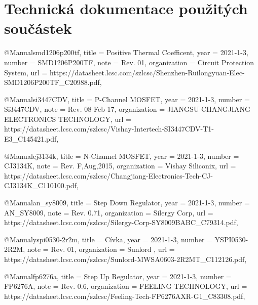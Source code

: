 \section{Technická dokumentace použitých součástek}

@Manual{smd1206p200tf,
    title        = {Positive Thermal Coefficent},
    year         = {2021-1-3},
    number       = {SMD1206P200TF},
    note         = {Rev. 01},
    organization = {Circuit Protection System},
    url          = {https://datasheet.lcsc.com/szlcsc/Shenzhen-Ruilongyuan-Elec-SMD1206P200TF_C20988.pdf},
}

@Manual{si3447CDV,
    title        = {P-Channel MOSFET},
    year         = {2021-1-3},
    number       = {Si3447CDV},
    note         = {Rev. 08-Feb-17},
    organization = {JIANGSU CHANGJIANG ELECTRONICS TECHNOLOGY},
    url          = {https://datasheet.lcsc.com/szlcsc/Vishay-Intertech-SI3447CDV-T1-E3_C145421.pdf},
}

@Manual{cj3134k,
    title        = {N-Channel MOSFET},
    year         = {2021-1-3},
    number       = {CJ3134K},
    note         = {Rev. F,Aug,2015},
    organization = {Vishay Siliconix},
    url          = {https://datasheet.lcsc.com/szlcsc/Changjiang-Electronics-Tech-CJ-CJ3134K_C110100.pdf},
}

@Manual{an_sy8009,
    title        = {Step Down Regulator},
    year         = {2021-1-3},
    number       = {AN_SY8009},
    note         = {Rev. 0.71},
    organization = {Silergy Corp},
    url          = {https://datasheet.lcsc.com/szlcsc/Silergy-Corp-SY8009BABC_C79314.pdf},
}

@Manual{yspi0530-2r2m,
    title        = {Cívka},
    year         = {2021-1-3},
    number       = {YSPI0530-2R2M},
    note         = {Rev. 01},
    organization = {Sunlord },
    url          = {https://datasheet.lcsc.com/szlcsc/Sunlord-MWSA0603-2R2MT_C112126.pdf},
}

@Manual{fp6276a,
    title        = {Step Up Regulator},
    year         = {2021-1-3},
    number       = {FP6276A},
    note         = {Rev. 0.6},
    organization = {FEELING TECHNOLOGY},
    url          = {https://datasheet.lcsc.com/szlcsc/Feeling-Tech-FP6276AXR-G1_C83308.pdf},
}

